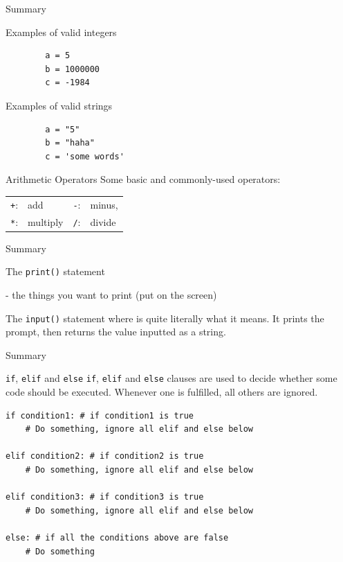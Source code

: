 \documentclass[dvipsnames, svgnames, x11names, handout]{beamer}
\begin{document}
\begin{frame}[fragile]{Summary}
    \begin{block}{Examples of valid integers}
        \begin{verbatim}
        a = 5  
        b = 1000000   
        c = -1984
        \end{verbatim}
    \end{block}
    \begin{block}{Examples of valid strings}
        \begin{verbatim}
        a = "5"
        b = "haha"   
        c = 'some words'
        \end{verbatim}
    \end{block}
    \begin{block}{Arithmetic Operators}
        Some basic and commonly-used operators:\\
        \centering
        \begin{tabular}{rlrl}
        \texttt{+}:& add & \texttt{-}:& minus,\\
        \texttt{*}:& multiply & \texttt{/}:& divide
        \end{tabular}
    \end{block}
\end{frame}

\begin{frame}[fragile]{Summary}
\begin{block}{The \texttt{print()} statement}

 - the things you want to print (put on the screen)
\end{block}

\begin{block}{The \texttt{input()} statement}
where  is quite literally what it means. It prints the prompt, then returns the value inputted as a string.
\end{block}
\end{frame}

\begin{frame}[fragile]{Summary}
\begin{block}{\texttt{if}, \texttt{elif} and \texttt{else}}
\texttt{if}, \texttt{elif} and \texttt{else} clauses are used to decide whether some code should be executed.
Whenever one is fulfilled, all others are ignored.
\begin{verbatim}
if condition1: # if condition1 is true
    # Do something, ignore all elif and else below

elif condition2: # if condition2 is true
    # Do something, ignore all elif and else below

elif condition3: # if condition3 is true
    # Do something, ignore all elif and else below

else: # if all the conditions above are false
    # Do something
\end{verbatim}
\end{block}
\end{frame}
\end{document}
